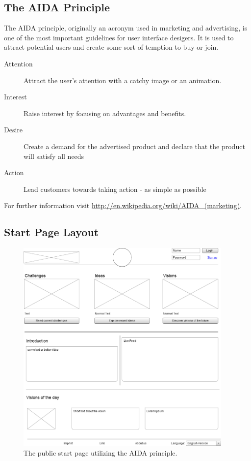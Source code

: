 \documentclass[a4paper, notitlepage, oneside]{article}
\begin{document}
\subsection{The AIDA Principle}

The AIDA principle, originally an acronym used in marketing and advertising, is one of the most important guidelines for user interface desigers. It is used to attract potential users and create some sort of temption to buy or join.

\begin{description}
	\item[Attention] Attract the user's attention with a catchy image or an animation.
	\item[Interest] Raise interest by focusing on advantages and benefits.
	\item[Desire] Create a demand for the advertised product and declare that the product will satisfy all needs
	\item[Action] Lead customers towards taking action - as simple as possible
\end{description}

For further information visit \url{http://en.wikipedia.org/wiki/AIDA_(marketing)}.

\subsection{Start Page Layout}

\begin{figure}[htb]
	\centering
	\includegraphics[width=0.95\textwidth]{home}
	\caption{The public start page utilizing the AIDA principle.}
	\label{fig:home}
\end{figure}
\end{document}
